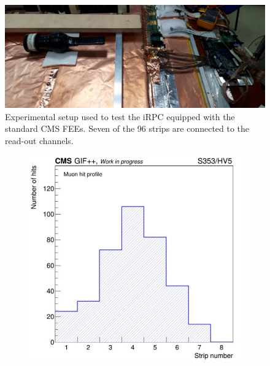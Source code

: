 	\begin{figure}[H]
		\centering
		\includegraphics[width = 0.7\linewidth]{fig/chapt6/iRPC-CMS_FEB-Setup.png}
		\caption{\label{fig:iRPC_CMS_Setup} Experimental setup used to test the iRPC equipped with the standard CMS FEEs. Seven of the 96 strips are connected to the read-out channels.}
    \end{figure}

	\begin{figure}[H]
		\begin{subfigure}{0.5\linewidth}
		    \centering
			\includegraphics[width = .8\linewidth]{fig/chapt6/iRPC-CMS_FEB-HitProfile.png}
			\caption{\label{fig:iRPC_CMS_Profiles:A}}
		\end{subfigure}
		\begin{subfigure}{0.5\linewidth}
		    \centering

\end{subfigure}
\end{figure}
